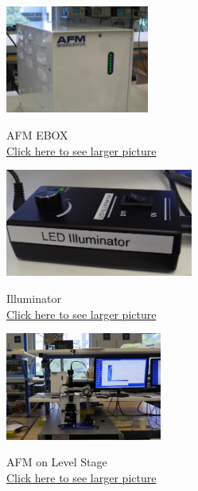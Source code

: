 \documentclass{../lab}
\begin{document}
\begin{figure}[H]
  \href{http://experimentationlab.berkeley.edu/sites/default/files/AFMImages/9.JPG}{\includegraphics[height=100pt,keepaspectratio]{images/9.JPG}}
  \caption{\centering AFM EBOX\\ \href{http://experimentationlab.berkeley.edu/sites/default/files/AFMImages/9.JPG}{Click here to see larger picture}}
  \label{fig:AFMEBox}
\endminipage\hfill
{}
  \href{http://experimentationlab.berkeley.edu/sites/default/files/AFMImages/LED2.jpg}{\includegraphics[height=100pt,keepaspectratio]{images/LED2.jpg}}
  \caption{\centering Illuminator \\ \href{http://experimentationlab.berkeley.edu/sites/default/files/AFMImages/LED2.jpg}{Click here to see larger picture}}
  \label{fig:Illuminator}
\endminipage\hfill
{}
  \href{http://experimentationlab.berkeley.edu/sites/default/files/AFMImages/AFMstation.jpg}{\includegraphics[height=100pt,keepaspectratio]{images/AFMstation.jpg}}
  \caption{\centering AFM on Level Stage \\ \href{http://experimentationlab.berkeley.edu/sites/default/files/AFMImages/AFMstation.jpg}{Click here to see larger picture}}
  \label{fig:LevelStage}
\endminipage
\end{figure}
\end{document}
